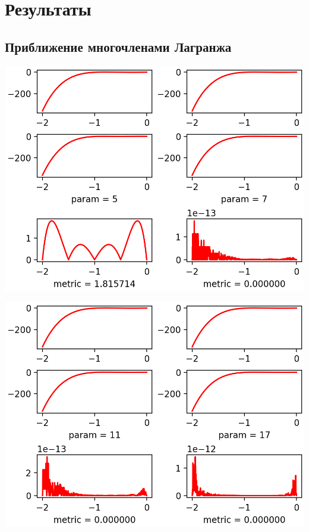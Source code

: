 \documentclass{article}
\begin{document}
\section{Результаты}

\subsection{Приближение многочленами Лагранжа}
\begin{Center}
\includegraphics{F1_p5p7_Lagrange.png}
\hfill

\includegraphics{F1_p11p17_Lagrange.png}
\hfill


\end{Center}
\end{document}
